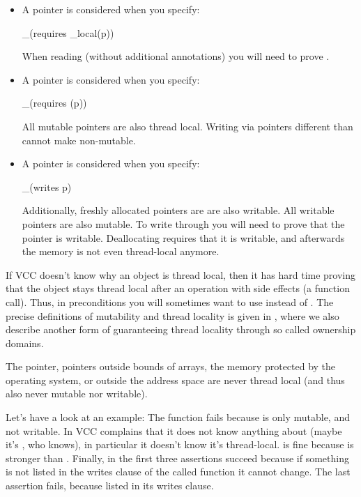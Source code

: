 \begin{itemize}
\item A pointer  is considered 
when you specify:
\begin{VCC}
_(requires \thread_local(p))
\end{VCC}
When reading  (without additional annotations) you will need to prove .

\item A pointer  is considered  when you specify:
\begin{VCC}
_(requires \mutable(p))
\end{VCC}
All mutable pointers are also thread local.
Writing via pointers different than  cannot make  non-mutable.

\item A pointer  is considered  when you specify:
\begin{VCC}
_(writes p)
\end{VCC}
Additionally, freshly allocated pointers are are also writable.
All writable pointers are also mutable.
To write through  you will need to prove that the pointer is writable.
Deallocating  requires that it is writable, and afterwards
the memory is not even thread-local anymore.
\end{itemize}

\begin{note}
If VCC doesn't know why an object is thread local, then it has
hard time proving that the object stays thread local after an operation
with side effects (\eg a function call).
Thus, in preconditions you will sometimes want to use
 instead of .
The precise definitions of mutability and thread locality
is given in ,
where we also describe another form of guaranteeing thread locality
through so called ownership domains.
\end{note}

The  pointer, pointers outside bounds of arrays,
the memory protected by the operating system, or outside
the address space are never thread local (and thus also never mutable
nor writable).

Let's have a look at an example:
\noindent
The function  fails because  is only
mutable, and not writable.
In  VCC complains that it does not know
anything about  (maybe it's , who knows),
in particular it doesn't know it's thread-local.
 is fine because \vcc{\mutable} is stronger
than .
Finally, in  the first three assertions succeed
because if something is not listed in the writes clause
of the called function it cannot change.
The last assertion fails, because  listed 
in its writes clause.

